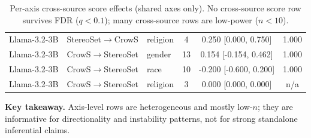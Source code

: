 \begin{table}[H]
{\begin{tabular}{lllccc}
Llama-3.2-3B & StereoSet$\rightarrow$CrowS & religion & 4 & 0.250 [0.000, 0.750] & 1.000 \\
Llama-3.2-3B & CrowS$\rightarrow$StereoSet & gender & 13 & 0.154 [-0.154, 0.462] & 1.000 \\
Llama-3.2-3B & CrowS$\rightarrow$StereoSet & race & 10 & -0.200 [-0.600, 0.200] & 1.000 \\
Llama-3.2-3B & CrowS$\rightarrow$StereoSet & religion & 3 & 0.000 [0.000, 0.000] & n/a \\
\bottomrule
\end{tabular}%
}
\caption{Per-axis cross-source score effects (shared axes only). No cross-source score row survives FDR ($q<0.1$); many cross-source rows are low-power ($n<10$).}
\label{tab:transfer-axis}
\end{table}
\noindent\textbf{Key takeaway.} Axis-level rows are heterogeneous and mostly low-$n$; they are informative for directionality and instability patterns, not for strong standalone inferential claims.

